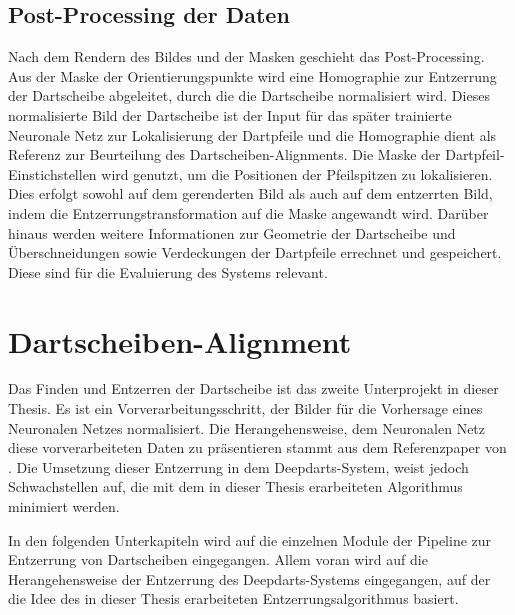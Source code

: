 \subsection{Post-Processing der Daten}
\label{sec:impl:daten:postprocess}

Nach dem Rendern des Bildes und der Masken geschieht das Post-Processing. Aus der Maske der Orientierungspunkte wird eine Homographie zur Entzerrung der Dartscheibe abgeleitet, durch die die Dartscheibe normalisiert wird. Dieses normalisierte Bild der Dartscheibe ist der Input für das später trainierte Neuronale Netz zur Lokalisierung der Dartpfeile und die Homographie dient als Referenz zur Beurteilung des Dartscheiben-Alignments. Die Maske der Dartpfeil-Einstichstellen wird genutzt, um die Positionen der Pfeilspitzen zu lokalisieren. Dies erfolgt sowohl auf dem gerenderten Bild als auch auf dem entzerrten Bild, indem die Entzerrungstransformation auf die Maske angewandt wird. Darüber hinaus werden weitere Informationen zur Geometrie der Dartscheibe und Überschneidungen sowie Verdeckungen der Dartpfeile errechnet und gespeichert. Diese sind für die Evaluierung des Systems relevant.


\section{Dartscheiben-Alignment}
\label{sec:impl:cv}

Das Finden und Entzerren der Dartscheibe ist das zweite Unterprojekt in dieser Thesis. Es ist ein Vorverarbeitungsschritt, der Bilder für die Vorhersage eines Neuronalen Netzes normalisiert. Die Herangehensweise, dem Neuronalen Netz diese vorverarbeiteten Daten zu präsentieren stammt aus dem Referenzpaper von \citeauthor{deepdarts} \cite{deepdarts}. Die Umsetzung dieser Entzerrung in dem Deepdarts-System, weist jedoch Schwachstellen auf, die mit dem in dieser Thesis erarbeiteten Algorithmus minimiert werden.

In den folgenden Unterkapiteln wird auf die einzelnen Module der Pipeline zur Entzerrung von Dartscheiben eingegangen. Allem voran wird auf die Herangehensweise der Entzerrung des Deepdarts-Systems eingegangen, auf der die Idee des in dieser Thesis erarbeiteten Entzerrungsalgorithmus basiert.



